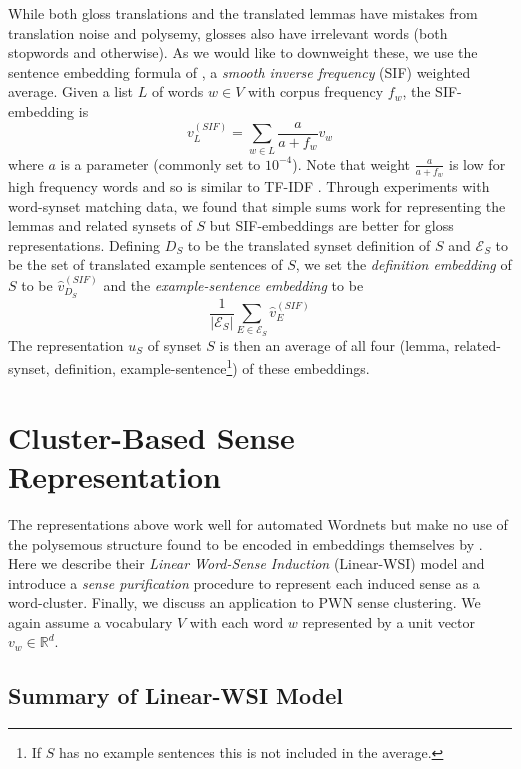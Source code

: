 \documentclass{book}
\begin{document}
While both gloss translations and the translated lemmas have mistakes from translation noise and polysemy, glosses also have irrelevant words (both stopwords and otherwise).
As we would like to downweight these, we use the sentence embedding formula of \cite{sentence}, a {\em smooth inverse frequency} (SIF) weighted average.
Given a list $L$ of words $w\in V$ with corpus frequency $f_w$, the SIF-embedding is
$$v_L^{(SIF)}=\sum\limits_{w\in L}\frac{a}{a+f_w}v_w$$
where $a$ is a parameter (commonly set to $10^{-4}$). Note that weight $\frac{a}{a+f_w}$ is low for high frequency words and so is similar to TF-IDF \citep{Salton:88}.
Through experiments with word-synset matching data, we found that simple sums work for representing the lemmas and related synsets of $S$ but SIF-embeddings are better for gloss representations.
Defining $D_S$ to be the translated synset definition of $S$ and $\mathcal{E}_S$ to be the set of translated example sentences of $S$, we set the {\em definition embedding} of $S$ to be $\hat{v}_{D_S}^{(SIF)}$ and the {\em example-sentence embedding} to be
$$\frac{1}{|\mathcal{E}_S|}\sum\limits_{E\in\mathcal{E}_S}\hat{v}_E^{(SIF)}$$
The representation $u_S$ of synset $S$ is then an average of all four (lemma, related-synset, definition, example-sentence\footnote{If $S$ has no example sentences this is not included in the average.}) of these embeddings.

\section{Cluster-Based Sense Representation}
\label{sec:senserep}

The representations above work well for automated Wordnets but make no use of the polysemous structure found to be encoded in embeddings themselves by \cite{polysemy}.
Here we describe their {\em Linear Word-Sense Induction} (Linear-WSI) model and introduce a {\em sense purification} procedure to represent each induced sense as a word-cluster.
Finally, we discuss an application to PWN sense clustering.
We again assume a vocabulary $V$ with each word $w$ represented by a unit vector $v_w\in\mathbb{R}^d$.

\subsection{Summary of Linear-WSI Model}
\label{subsec:wsi}
\end{document}
